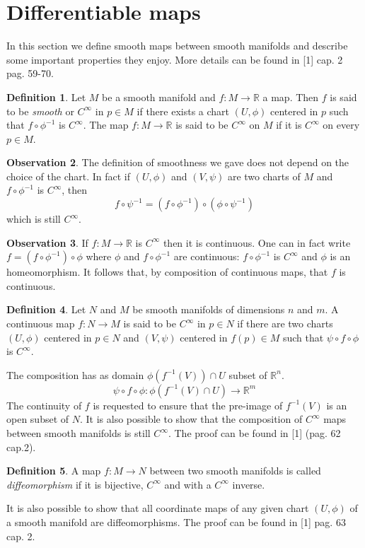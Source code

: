 \documentclass[12pt,a4paper]{report}
\theoremstyle{definition}
\newtheorem{Def}{Definition}[chapter]
\theoremstyle{Theorem}
\theoremstyle{definition}
\theoremstyle{definition}
\newtheorem{Obs}[Def]{Observation}
\begin{document}
	\section{Differentiable maps}
	In this section we define smooth maps between smooth manifolds and describe some important properties they enjoy. More details can be found in [1] cap. 2 pag. 59-70.
	\begin{Def}
		Let $M$ be a smooth manifold and $f:M\rightarrow\mathbb{R}$ a map. Then $f$ is said to be \textit{smooth} or $C^\infty$ in $p\in M$ if there exists a chart $(U,\phi)$ centered in $p$ such that $f\circ \phi^{-1}$ is $C^\infty$. The map $f:M\rightarrow \mathbb{R}$ is said to be $C^\infty$ on $M$ if it is $C^\infty$ on every $p\in M$.
	\end{Def}
	\begin{Obs}
		The definition of smoothness we gave does not depend on the choice of the chart. In fact if $(U,\phi)$ and $(V,\psi)$ are two charts of $M$ and $f\circ\phi^{-1}$ is $C^\infty$, then $$f\circ\psi^{-1}=(f\circ\phi^{-1})\circ(\phi\circ\psi^{-1})$$ which is still $C^\infty$.
	\end{Obs}
	\begin{Obs}
		If $f:M\rightarrow \mathbb{R}$ is $C^\infty$ then it is continuous. One can in fact write $f=(f\circ\phi^{-1})\circ \phi$ where $\phi$ and $f\circ\phi^{-1}$ are continuous: $f\circ\phi^{-1}$ is $C^\infty$ and $\phi$ is an homeomorphism. It follows that, by composition of continuous maps, that $f$ is continuous.\\
	\end{Obs}
	\begin{Def}
		Let $N$ and $M$ be smooth manifolds of dimensions $n$ and $m$. A continuous map $f:N\rightarrow M$ is said to be $C^\infty$ in $p\in N$ if there are two charts $(U,\phi)$ centered in $p\in N$ and $(V,\psi)$ centered in $f(p)\in M$ such that $\psi\circ f\circ \phi$ is $C^\infty$.
	\end{Def}
	The composition has as domain $\phi(f^{-1}(V))\cap U$ subset of $\mathbb{R}^n$. $$\psi\circ f\circ \phi:\phi(f^{-1}(V)\cap U)\rightarrow \mathbb{R}^m$$
	The continuity of $f$ is requested to ensure that the pre-image of $f^{-1}(V)$ is an open subset of $N$. It is also possible to show that the composition of $C^\infty$ maps between smooth manifolds is still $C^\infty$. The proof can be found in [1] (pag. 62 cap.2). 
	\begin{Def}
		A map $f:M\rightarrow N$ between two smooth manifolds is called \textit{diffeomorphism} if it is bijective, $C^\infty$ and with a $C^\infty$ inverse.
	\end{Def}
	It is also possible to show that all coordinate maps of any given chart $(U,\phi)$ of a smooth manifold are diffeomorphisms. The proof can be found in [1] pag. 63 cap. 2.
\end{document}
